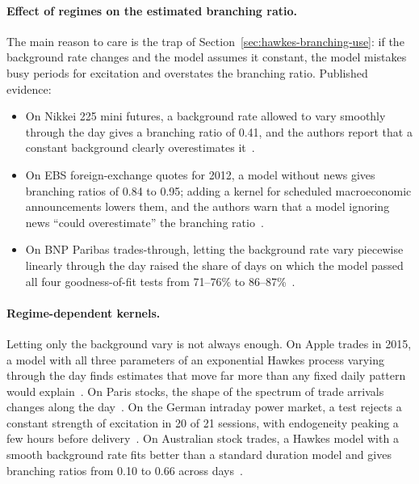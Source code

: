 \paragraph{Effect of regimes on the estimated branching ratio.} The main reason to care is the trap of
Section~\ref{sec:hawkes-branching-use}: if the background rate changes and the model assumes it constant, the model
mistakes busy periods for excitation and overstates the branching ratio. Published evidence:
\begin{itemize}[leftmargin=1.5em,itemsep=2pt]
\item On Nikkei 225 mini futures, a background rate allowed to vary smoothly through the day gives a branching
  ratio of 0.41, and the authors report that a constant background clearly overestimates it~\citep{omi2017tdb}.
\item On EBS foreign-exchange quotes for 2012, a model without news gives branching ratios of 0.84 to 0.95;
  adding a kernel for scheduled macroeconomic announcements lowers them, and the authors warn that a model ignoring news ``could overestimate'' the branching ratio~\citep{rambaldi2015news}.
\item On BNP Paribas trades-through, letting the background rate vary piecewise linearly through the day raised the
  share of days on which the model passed all four goodness-of-fit tests from 71--76\% to
  86--87\%~\citep{munitokepomponio2012}.
\end{itemize}

\paragraph{Regime-dependent kernels.} Letting only the background vary is not always enough. On Apple trades in
2015, a model with all three parameters of an exponential Hawkes process varying through the day finds estimates
that move far more than any fixed daily pattern would explain~\citep{clinetpotiron2018}. On Paris stocks, the shape
of the spectrum of trade arrivals changes along the day~\citep{roueffvonsachs2019}. On the German intraday power
market, a test rejects a constant strength of excitation in 20 of 21 sessions, with endogeneity peaking a few hours
before delivery~\citep{deschatre2025nonlocal}. On Australian stock trades, a Hawkes model with a smooth background
rate fits better than a standard duration model and gives branching ratios from 0.10 to 0.66 across
days~\citep{chenhall2013seppvb}.

